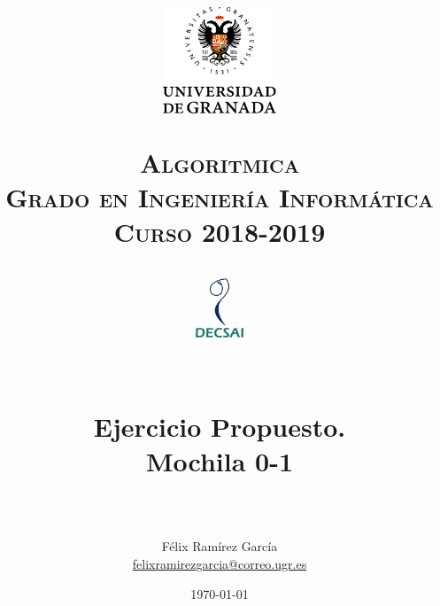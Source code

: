 
\usepackage{url}

\title{	
	\normalfont \normalsize
	\begin{figure}[htb]
		\centering
		\includegraphics[width=0.3\textwidth]{./imagenes/1}
	\end{figure}
	\textsc{\textbf{Algoritmica} \\ Grado en Ingeniería Informática \\ 
	Curso 2018-2019} \\ [25pt] 
	\begin{figure}[htb]
		\centering
		\includegraphics[width=0.15\textwidth]{./imagenes/2}
	\end{figure}
	\horrule{0.5pt} \\[0.4cm]
	\huge Ejercicio Propuesto. \\
	\huge Mochila 0-1
	\\ 
	\horrule{2pt} \\[0.5cm] 
}
\author{Félix Ramírez García  \\
\href{mailto:felixramirezgarcia@correo.ugr.es}{felixramirezgarcia@correo.ugr.es}}
\date{\normalsize\today} 



	
	\maketitle %
	
	\newpage %
	
	\tableofcontents %
	
	\listoffigures %
	
